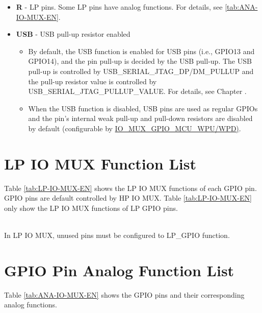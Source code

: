 \documentclass[main\_\_EN.tex]{subfiles}
\begin{document}
    \begin{itemize}
        \item \textbf{R} - LP pins. Some LP pins have analog functions. For details, see \ref{tab:ANA-IO-MUX-EN}.
\item \textbf{USB} - USB pull-up resistor enabled 
\begin{itemize}
    \item By default, the USB function is enabled for USB pins (i.e., GPIO13 and GPIO14), and the pin pull-up is decided by the USB pull-up. The USB pull-up is controlled by USB\_SERIAL\_JTAG\_DP/DM\_PULLUP and the pull-up resistor value is controlled by USB\_SERIAL\_JTAG\_PULLUP\_VALUE. For details, see Chapter .
    \item When the USB function is disabled, USB pins are used as regular GPIOs and the pin's internal weak pull-up and pull-down resistors are disabled by default (configurable by \hyperref[fielddesc:IOMUXGPIONMCUWPU]{IO\_MUX\_GPIO\_MCU\_WPU/WPD)}.
    \end{itemize}
 \end{itemize}

\section{LP IO MUX Function List}

Table \ref{tab:LP-IO-MUX-EN} shows the LP IO MUX functions of each GPIO pin. GPIO pins are default controlled by HP IO MUX. Table \ref{tab:LP-IO-MUX-EN} only show the LP IO MUX functions of LP GPIO pins.



\tableheaderLPFunctionsEN
\tablecontentLPFunctions

\begin{importantlisting}\\
In LP IO MUX, unused pins must be configured to LP\_GPIO function.
\end{importantlisting}


\section{GPIO Pin Analog Function List}

Table \ref{tab:ANA-IO-MUX-EN} shows the GPIO pins and their corresponding analog functions.


\tableheaderAnalogFunctionsEN
\tablecontentAnalogFunctions
\end{document}
